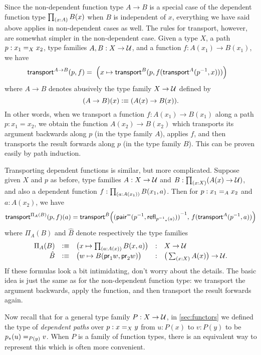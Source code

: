 Since the non-dependent function type $A\to B$ is a special case of the dependent function type $\prd{x:A} B(x)$ when $B$ is independent of $x$, everything we have said above applies in non-dependent cases as well.
The rules for transport, however, are somewhat simpler in the non-dependent case.
Given a type $X$, a path $p:\id[X]{x_1}{x_2}$, type families $A,B:X\to \type$, and a function $f : A(x_1) \to B(x_1)$,  we have
\begin{align}\label{eq:transport-arrow}
  \transfib{A\to B}{p}{f} &=
  \; \Big(x \mapsto \transfib{B}{p}{f(\transfib{A}{\opp p}{x})}\Big)
\end{align}
where $A\to B$ denotes abusively the type family $X\to \type$ defined by
\[(A\to B)(x) \defeq (A(x)\to B(x)).\]
In other words, when we transport a function $f:A(x_1)\to B(x_1)$ along a path $p:x_1=x_2$, we obtain the function $A(x_2)\to B(x_2)$ which transports its argument backwards along $p$ (in the type family $A$), applies $f$, and then transports the result forwards along $p$ (in the type family $B$).
This can be proven easily by path induction.

Transporting dependent functions is similar, but more complicated.
Suppose given $X$ and $p$ as before, type families $A:X\to \type$ and $B:\prd{x:X} (A(x)\to\type)$, and also a dependent function $f : \prd{a:A(x_1)} B(x_1,a)$.
Then for $p:\id[A]{x_1}{x_2}$ and $a:A(x_2)$, we have
\begin{align*}
  \transfib{\Pi_A(B)}{p}{f}(a) =
  \Transfib{\hat{B}}{\opp{(\pairpath(\opp{p},\refl{ \trans{\opp p}{a} }))}}{f(\transfib{A}{\opp p}{a})}
\end{align*}
where $\Pi_A(B)$ and $\hat{B}$ denote respectively the type families
\begin{equation}\label{eq:transport-arrow-families}
\begin{array}{rclcl}
\Pi_A(B) &\defeq& \big(x\mapsto \prd{a:A(x)} B(x,a) \big) &:& X\to \type\\
\hat{B} &\defeq& \big(w \mapsto B(\proj1w,\proj2w) \big) &:& \big(\sm{x:X} A(x)\big) \to \type.
\end{array}
\end{equation}
If these formulas look a bit intimidating, don't worry about the details.
The basic idea is just the same as for the non-dependent function type: we transport the argument backwards, apply the function, and then transport the result forwards again.

Now recall that for a general type family $P:X\to\type$, in \autoref{sec:functors} we defined the type of \emph{dependent paths} over $p:\id[X]xy$ from $u:P(x)$ to $v:P(y)$ to be $\id[P(y)]{\trans{p}{u}}{v}$.
When $P$ is a family of function types, there is an equivalent way to represent this which is often more convenient.

